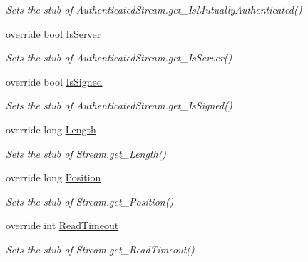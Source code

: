 \begin{DoxyCompactItemize}
\begin{DoxyCompactList}\small\item\em Sets the stub of Authenticated\-Stream.\-get\-\_\-\-Is\-Mutually\-Authenticated()\end{DoxyCompactList}\item 
override bool \hyperlink{class_system_1_1_net_1_1_security_1_1_fakes_1_1_stub_authenticated_stream_a1b8496b36ef7f15c45fb026a22b41524}{Is\-Server}
\begin{DoxyCompactList}\small\item\em Sets the stub of Authenticated\-Stream.\-get\-\_\-\-Is\-Server()\end{DoxyCompactList}\item 
override bool \hyperlink{class_system_1_1_net_1_1_security_1_1_fakes_1_1_stub_authenticated_stream_a5203d386391642ca4ac8f2bc942190db}{Is\-Signed}
\begin{DoxyCompactList}\small\item\em Sets the stub of Authenticated\-Stream.\-get\-\_\-\-Is\-Signed()\end{DoxyCompactList}\item 
override long \hyperlink{class_system_1_1_net_1_1_security_1_1_fakes_1_1_stub_authenticated_stream_a5abe3b06c5979815fac6f3a9d37d5c99}{Length}
\begin{DoxyCompactList}\small\item\em Sets the stub of Stream.\-get\-\_\-\-Length()\end{DoxyCompactList}\item 
override long \hyperlink{class_system_1_1_net_1_1_security_1_1_fakes_1_1_stub_authenticated_stream_afbef2b6a54ed0628f5cb560eccacfbcf}{Position}
\begin{DoxyCompactList}\small\item\em Sets the stub of Stream.\-get\-\_\-\-Position()\end{DoxyCompactList}\item 
override int \hyperlink{class_system_1_1_net_1_1_security_1_1_fakes_1_1_stub_authenticated_stream_a6f25cd75b801c62de2dae0f9a6842bc7}{Read\-Timeout}
\begin{DoxyCompactList}\small\item\em Sets the stub of Stream.\-get\-\_\-\-Read\-Timeout()\end{DoxyCompactList}\item 

\end{DoxyCompactItemize}

